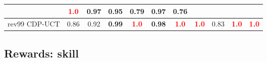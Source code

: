 \documentclass{article}
\begin{document}
\begin{tabular}{|l|r@{$\pm$}rr@{$\pm$}rr@{$\pm$}rr@{$\pm$}rr@{$\pm$}rr@{$\pm$}rr@{$\pm$}rr@{$\pm$}rr@{$\pm$}rr@{$\pm$}r|}
& \multicolumn{2}{c}{\textbf{\textcolor{red}{1.0}}}
& \multicolumn{2}{c}{0.97}
& \multicolumn{2}{c}{0.95}
& \multicolumn{2}{c}{0.79}
& \multicolumn{2}{c}{0.97}
& \multicolumn{2}{c|}{0.76}
\\
\hline
rev99 CDP-UCT
& \multicolumn{2}{c}{0.86}
& \multicolumn{2}{c}{0.92}
& \multicolumn{2}{c}{\textbf{0.99}}
& \multicolumn{2}{c}{\textbf{\textcolor{red}{1.0}}}
& \multicolumn{2}{c}{\textbf{0.98}}
& \multicolumn{2}{c}{\textbf{\textcolor{red}{1.0}}}
& \multicolumn{2}{c}{\textbf{\textcolor{red}{1.0}}}
& \multicolumn{2}{c}{0.83}
& \multicolumn{2}{c}{\textbf{\textcolor{red}{1.0}}}
& \multicolumn{2}{c|}{\textbf{\textcolor{red}{1.0}}}
\\
\hline
\end{tabular}%

\bigskip

\subsection*{Rewards: skill}
\end{document}
